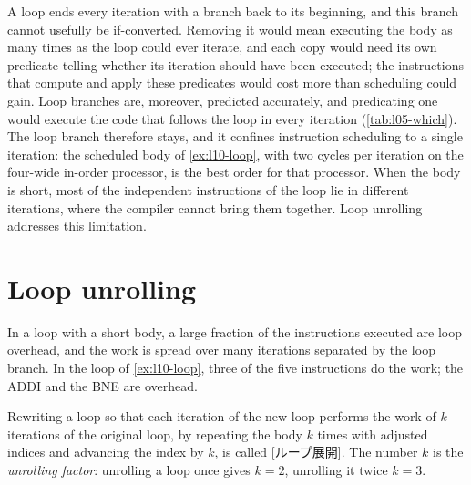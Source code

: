 \documentclass[../main.tex]{subfiles}
\begin{document}
A loop ends every iteration with a branch back to its beginning, and this
branch cannot usefully be if-converted.  Removing it would mean executing the
body as many times as the loop could ever iterate, and each copy would need
its own predicate telling whether its iteration should have been executed; the
instructions that compute and apply these predicates would cost more than
scheduling could gain.  Loop branches are, moreover, predicted accurately, and
predicating one would execute the code that follows the loop in every
iteration (\cref{tab:l05-which}).  The loop branch therefore stays, and it
confines instruction scheduling to a single iteration: the scheduled body of
\cref{ex:l10-loop}, with two cycles per iteration on the four-wide in-order
processor, is the best order for that processor.  When the body is short, most
of the independent instructions of the loop lie in different iterations, where
the compiler cannot bring them together.  Loop unrolling addresses this
limitation.

\section{Loop unrolling}
\label{sec:l10-unrolling}

In a loop with a short body, a large fraction of the instructions executed are
loop overhead, and the work is spread over many iterations separated by the
loop branch.  In the loop of
\cref{ex:l10-loop}, three of the five instructions do the work; the ADDI and
the BNE are overhead.

\begin{definition}
  \label{def:l10-unrolling}
  Rewriting a loop so that each iteration of the new loop performs the work of
  $k$ iterations of the original loop, by repeating the body $k$ times with
  adjusted indices and advancing the index by $k$, is called [ループ展開].  The number $k$ is the \emph{unrolling factor}:
  unrolling a loop once gives $k=2$, unrolling it twice $k=3$.
\end{definition}
\end{document}
